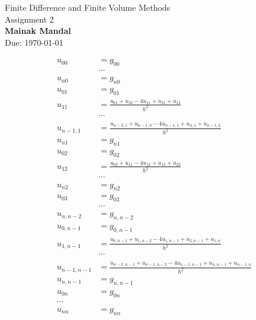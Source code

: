 \documentclass[]{book}
\theoremstyle{definition}
\begin{document}
\begin{center}
{\Large Finite Difference and Finite Volume Methods \\
\vspace{1mm} Assignment 2}\\
\textbf{Mainak Mandal}\\ %
Due: \today %
\end{center}

\vspace{0.2 cm}

\begin{align*}
u_{00}&=g_{00}\\
&\cdots\\
u_{n0}&=g_{n0}\\
%
%
u_{01}&=g_{01}\\
u_{11}&=\frac{u_{01}+u_{10}-4u_{11}+u_{21}+u_{12}}{h^2}\\
&\cdots\\
u_{n-1,1}&=\frac{u_{n-2,1}+u_{n-1,0}-4u_{n-1,1}+u_{n,1}+u_{n-1,2}}{h^2}\\
u_{n1}&=g_{n1}\\
u_{02}&=g_{02}\\
u_{12}&=\frac{u_{02}+u_{11}-4u_{12}+u_{13}+u_{22}}{h^2}\\
&\cdots\\
u_{n2}&=g_{n2}\\
u_{03}&=g_{03}\\
&\cdots\\
u_{n,n-2}&=g_{n,n-2}\\
%
%
u_{0,n-1}&=g_{0,n-1}\\
u_{1,n-1}&=\frac{u_{0,n-1}+u_{1,n-2}-4u_{1,n-1}+u_{2,n-1}+u_{1,n}}{h^2}\\
&\cdots\\
u_{n-1,n-1}&=\frac{u_{n-2,n-1}+u_{n-1,n-2}-4u_{n-1,n-1}+u_{n,n-1}+u_{n-1,n}}{h^2}\\
u_{n,n-1}&=g_{n,n-1}\\
%
%
u_{0n}&=g_{0n}\\
\cdots\\
u_{nn}&=g_{nn}
\end{align*}
\end{document}
